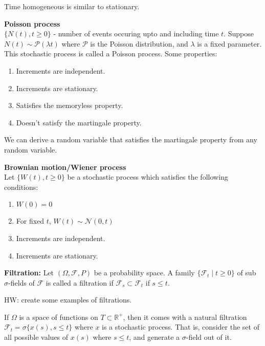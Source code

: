 \documentclass[a4paper]{article}
\newcommand{\nl}{\vspace{0.2cm}\\}
\renewcommand{\sp}{\vspace{0.2cm}}
\newcommand{\F}{\mathcal{F}}
\renewcommand{\P}{\mathcal{P}}
\newcommand{\N}{\mathcal{N}}
\newcommand{\R}{\mathbb{R}}
\begin{document}
Time homogeneous is similar to stationary.
\sp
\begin{eg}
    \textbf{Poisson process}\nl
    $\{N(t), t \ge 0\}$ - number of events occuring upto and including time $t$. Suppose $N(t) \sim \P(\lambda t)$ where $\P$ is the Poisson distribution, and $\lambda$ is a fixed
    parameter. This stochastic process is called a Poisson process. Some properties:
    \begin{enumerate}
        \item Increments are independent.
        \item Increments are stationary.
        \item Satisfies the memoryless property.
        \item Doesn't satisfy the martingale property.
    \end{enumerate}
    We can derive a random variable that satisfies the martingale property from any random variable.
\end{eg}
\sp
\begin{eg}
    \textbf{Brownian motion/Wiener process}\nl
    Let $\{W(t), t \ge 0\}$ be a stochastic process which satisfies the following conditions:
    \begin{enumerate}
        \item $W(0) = 0$
        \item For fixed $t$, $W(t) \sim \N(0, t)$
        \item Increments are independent.
        \item Increments are stationary.
    \end{enumerate}
\end{eg}



\begin{defn}
    \textbf{Filtration:}
    Let $(\Omega, \F, P)$ be a probability space. A family $\{\F_t \mid t \ge 0\}$ of sub $\sigma$-fields of $\F$ is called a filtration if $\F_s \subset \F_t$ if $s \le t$.
\end{defn}
\sp
HW: create some examples of filtrations.\nl
\begin{defn}
    If $\Omega$ is a space of functions on $T \subset \R^+$, then it comes with a natural filtration $\F_t = \sigma \{x(s), s \le t\}$ where $x$ is a stochastic process. That is, consider the
    set of all possible values of $x(s)$ where $s \le t$, and generate a $\sigma$-field out of it.

\end{defn}
\end{document}
